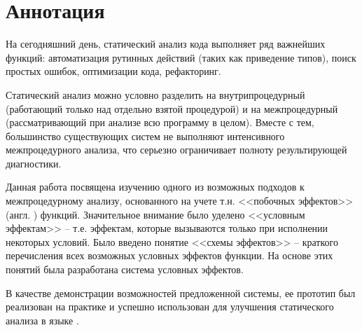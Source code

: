 \section*{Аннотация}

На сегодняшний день, статический анализ кода выполняет ряд важнейших функций: автоматизация рутинных действий (таких как приведение типов), поиск простых ошибок, оптимизации кода, рефакторинг.

Статический анализ можно условно разделить на внутрипроцедурный (работающий только над отдельно взятой процедурой) и на межпроцедурный (рассматривающий при анализе всю программу в целом). Вместе с тем, большинство существующих систем не выполняют интенсивного межпроцедурного анализа, что серьезно ограничивает полноту результирующей диагностики.

Данная работа посвящена изучению одного из возможных подходов к межпроцедурному анализу, основанного на учете т.н. <<побочных эффектов>> (англ. ) функций. Значительное внимание было уделено <<условным эффектам>> -- т.е. эффектам, которые вызываются только при исполнении некоторых условий. Было введено понятие <<схемы эффектов>> -- краткого перечисления всех возможных условных эффектов функции. На основе этих понятий была разработана система условных эффектов.

В качестве демонстрации возможностей предложенной системы, ее прототип был реализован на практике и успешно использован для улучшения статического анализа в языке .